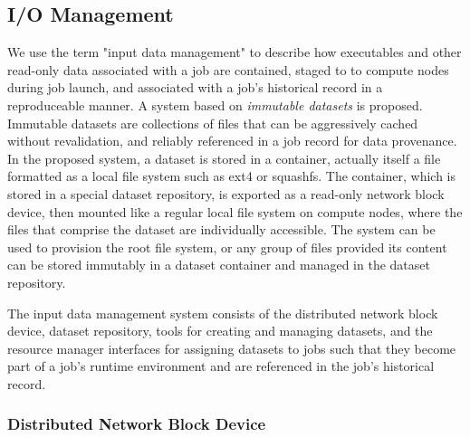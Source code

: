 \subsection{I/O Management}

We use the term "input data management" to describe how executables
and other read-only data associated with a job are contained,
staged to to compute nodes during job launch, and associated with a job's
historical record in a reproduceable manner.
A system based on {\em immutable datasets} is proposed.
Immutable datasets are collections of files that can be aggressively cached
without revalidation,
and reliably referenced in a job record for data provenance.
In the proposed system, a dataset is stored in a container,
actually itself a file formatted as a local file system such as ext4 or
squashfs.  The container, which is stored in a special dataset repository,
is exported as a read-only network block device,
then mounted like a regular local file system on compute nodes,
where the files that comprise the dataset are individually accessible.
The system can be used to provision the root file system,
or any group of files provided its content can be stored immutably
in a dataset container and managed in the dataset repository.

The input data management system consists of the
distributed network block device,
dataset repository,
tools for creating and managing datasets,
and the resource manager interfaces for assigning datasets to jobs
such that they become part of a job's runtime environment and
are referenced in the job's historical record.

\subsubsection{Distributed Network Block Device}

